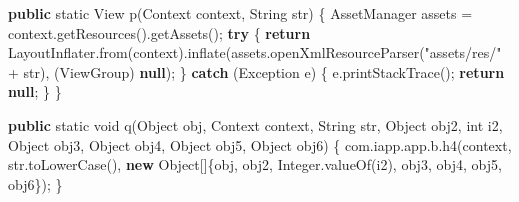 \documentclass[
]{article}
\newenvironment{Shaded}{}{}
\newcommand{\BuiltInTok}[1]{\textcolor[rgb]{0.00,0.50,0.00}{#1}}
\newcommand{\ControlFlowTok}[1]{\textcolor[rgb]{0.00,0.44,0.13}{\textbf{#1}}}
\newcommand{\DataTypeTok}[1]{\textcolor[rgb]{0.56,0.13,0.00}{#1}}
\newcommand{\FunctionTok}[1]{\textcolor[rgb]{0.02,0.16,0.49}{#1}}
\newcommand{\KeywordTok}[1]{\textcolor[rgb]{0.00,0.44,0.13}{\textbf{#1}}}
\newcommand{\NormalTok}[1]{#1}
\newcommand{\OperatorTok}[1]{\textcolor[rgb]{0.40,0.40,0.40}{#1}}
\newcommand{\StringTok}[1]{\textcolor[rgb]{0.25,0.44,0.63}{#1}}
\begin{document}
\begin{Shaded}
\begin{Highlighting}[]
    \KeywordTok{public} \DataTypeTok{static} \BuiltInTok{View} \FunctionTok{p}\OperatorTok{(}\BuiltInTok{Context}\NormalTok{ context}\OperatorTok{,} \BuiltInTok{String}\NormalTok{ str}\OperatorTok{)} \OperatorTok{\{}
\NormalTok{        AssetManager assets }\OperatorTok{=}\NormalTok{ context}\OperatorTok{.}\FunctionTok{getResources}\OperatorTok{().}\FunctionTok{getAssets}\OperatorTok{();}
        \ControlFlowTok{try} \OperatorTok{\{}
            \ControlFlowTok{return}\NormalTok{ LayoutInflater}\OperatorTok{.}\FunctionTok{from}\OperatorTok{(}\NormalTok{context}\OperatorTok{).}\FunctionTok{inflate}\OperatorTok{(}\NormalTok{assets}\OperatorTok{.}\FunctionTok{openXmlResourceParser}\OperatorTok{(}\StringTok{"assets/res/"} \OperatorTok{+}\NormalTok{ str}\OperatorTok{),} \OperatorTok{(}\NormalTok{ViewGroup}\OperatorTok{)} \KeywordTok{null}\OperatorTok{);}
        \OperatorTok{\}} \ControlFlowTok{catch} \OperatorTok{(}\BuiltInTok{Exception}\NormalTok{ e}\OperatorTok{)} \OperatorTok{\{}
\NormalTok{            e}\OperatorTok{.}\FunctionTok{printStackTrace}\OperatorTok{();}
            \ControlFlowTok{return} \KeywordTok{null}\OperatorTok{;}
        \OperatorTok{\}}
    \OperatorTok{\}}

    \KeywordTok{public} \DataTypeTok{static} \DataTypeTok{void} \FunctionTok{q}\OperatorTok{(}\BuiltInTok{Object}\NormalTok{ obj}\OperatorTok{,} \BuiltInTok{Context}\NormalTok{ context}\OperatorTok{,} \BuiltInTok{String}\NormalTok{ str}\OperatorTok{,} \BuiltInTok{Object}\NormalTok{ obj2}\OperatorTok{,} \DataTypeTok{int}\NormalTok{ i2}\OperatorTok{,} \BuiltInTok{Object}\NormalTok{ obj3}\OperatorTok{,} \BuiltInTok{Object}\NormalTok{ obj4}\OperatorTok{,} \BuiltInTok{Object}\NormalTok{ obj5}\OperatorTok{,} \BuiltInTok{Object}\NormalTok{ obj6}\OperatorTok{)} \OperatorTok{\{}
\NormalTok{        com}\OperatorTok{.}\FunctionTok{iapp}\OperatorTok{.}\FunctionTok{app}\OperatorTok{.}\FunctionTok{b}\OperatorTok{.}\FunctionTok{h4}\OperatorTok{(}\NormalTok{context}\OperatorTok{,}\NormalTok{ str}\OperatorTok{.}\FunctionTok{toLowerCase}\OperatorTok{(),} \KeywordTok{new} \BuiltInTok{Object}\OperatorTok{[]\{}\NormalTok{obj}\OperatorTok{,}\NormalTok{ obj2}\OperatorTok{,} \BuiltInTok{Integer}\OperatorTok{.}\FunctionTok{valueOf}\OperatorTok{(}\NormalTok{i2}\OperatorTok{),}\NormalTok{ obj3}\OperatorTok{,}\NormalTok{ obj4}\OperatorTok{,}\NormalTok{ obj5}\OperatorTok{,}\NormalTok{ obj6}\OperatorTok{\});}
    \OperatorTok{\}}


\end{Highlighting}
\end{Shaded}
\end{document}
